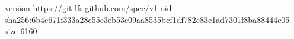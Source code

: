 version https://git-lfs.github.com/spec/v1
oid sha256:6b4e671f333a28e55c3eb53e09aa8535bcf1df782c83c1ad7301f8ba88444c05
size 6160
